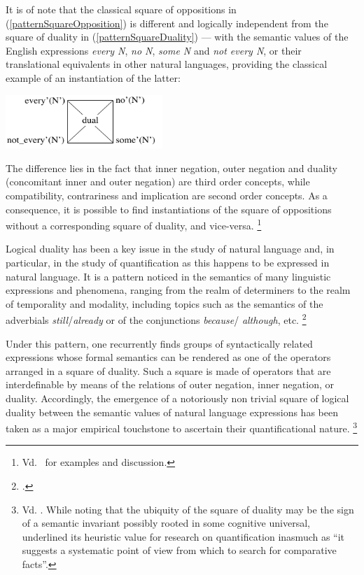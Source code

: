 \documentclass[output=paper
,modfonts
,nonflat]{langsci/langscibook}
\begin{document}
It is of note that 
the classical square of oppositions in (\ref{patternSquareOpposition})
is different and logically independent from
the square of duality in (\ref{patternSquareDuality}) --- with the semantic values of the English 
expressions {\em every N}, {\em no N},
{\em some N} and {\em not every N}, or their translational equivalents in
other natural languages, providing the classical example of an instantiation
of the latter:

\begin{exe}
\ex
\end{exe}
\vspace{-7mm}
\centerline{\hspace{0 mm}\includegraphics[width=14pc]{figures/classicalSquareDuality.pdf}}



The difference lies in the fact that inner negation, outer
negation and duality (concomitant inner and outer negation) are third order concepts, while compatibility, contrariness and
implication are second order concepts. As a consequence, it is possible
to find instantiations of the square of oppositions without a
corresponding square of duality, and vice-versa.%
\footnote{
Vd.~\citep{Lobner1987} for examples and discussion.
}


Logical duality has been a key issue in the study of natural language 
and, in particular, in the study of quantification as this happens to
be expressed in natural language.  It is a pattern noticed in the
semantics  of many linguistic expressions and phenomena, ranging from
the realm  of determiners to the realm of temporality and modality,
including topics  such as the semantics of the adverbials {\em
still}/{\em already} or of the conjunctions  {\em because}/{\em
although}, etc.%
\footnote{
\citep{Lobner1987, Lobner1989, Lobner1999, terMeulen1988, Konig1991, Smessaert1997}.
}

Under this pattern, one recurrently finds groups of syntactically related 
expressions whose formal semantics can be rendered as one of the operators
arranged in a square of duality. Such a square is made of operators that 
are interdefinable by means of the relations of outer negation, inner
negation, or duality.
Accordingly, 
the emergence of a notoriously non trivial square of logical duality
between the semantic values of natural language expressions has been taken 
as a major empirical touchstone to ascertain their quantificational nature.%
\footnote{
Vd. \citep{Lobner1987,vanBenthem1991}. While noting that the ubiquity of the square of duality 
may be the sign of a semantic invariant possibly rooted in some cognitive universal,  
\citep[]{vanBenthem1991} underlined its heuristic value for research
on quantification inasmuch as ``it suggests a systematic point of view from
which to search for comparative facts''.
}
\end{document}
